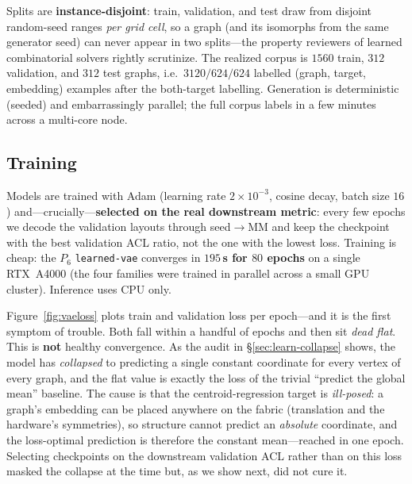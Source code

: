 \documentclass[acmsmall,anonymous,nonacm]{acmart}
\begin{document}
Splits are \textbf{instance-disjoint}: train, validation, and test draw from
disjoint random-seed ranges \emph{per grid cell}, so a graph (and its isomorphs from
the same generator seed) can never appear in two splits---the property reviewers of
learned combinatorial solvers rightly scrutinize. The realized corpus is $1560$
train, $312$ validation, and $312$ test graphs, i.e.\ $3120/624/624$ labelled
(graph, target, embedding) examples after the both-target labelling. Generation is
deterministic (seeded) and embarrassingly parallel; the full corpus labels in a few
minutes across a multi-core node.

\subsection{Training}
\label{sec:learn-train}

Models are trained with Adam \cite{kingma2015adam} (learning rate $2{\times}10^{-3}$,
cosine decay, batch size $16$) and---crucially---\textbf{selected on the real
downstream metric}: every few epochs we decode the validation layouts through
seed$\rightarrow$MM and keep the checkpoint with the best validation ACL ratio, not
the one with the lowest loss. Training is cheap: the $P_6$ \texttt{learned-vae}
converges in \textbf{$195$\,s for $80$ epochs} on a single RTX~A4000 (the four
families were trained in parallel across a small GPU cluster). Inference uses CPU
only.

Figure~\ref{fig:vaeloss} plots train and validation loss per epoch---and it is the
first symptom of trouble. Both fall within a handful of epochs and then sit \emph{dead
flat}. This is \textbf{not} healthy convergence. As the audit in
\S\ref{sec:learn-collapse} shows, the model has \emph{collapsed} to predicting a
single constant coordinate for every vertex of every graph, and the flat value is
exactly the loss of the trivial ``predict the global mean'' baseline. The cause is
that the centroid-regression target is \emph{ill-posed}: a graph's embedding can be
placed anywhere on the fabric (translation and the hardware's symmetries), so
structure cannot predict an \emph{absolute} coordinate, and the loss-optimal
prediction is therefore the constant mean---reached in one epoch. Selecting
checkpoints on the downstream validation ACL rather than on this loss masked the
collapse at the time but, as we show next, did not cure it.
\end{document}
